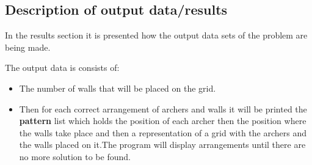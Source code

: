 \documentclass{article}
\begin{document}
\subsection{Description of output data/results}
\par In the results section it is presented how the output data sets of the problem
are being made.
\par The output data is consists of:
 \begin{itemize}
     \item The number of walls that will be placed on the grid.
     \item Then for each correct arrangement of archers and walls
     it will be printed the \textbf{pattern} list which holds the position of each archer
     then the position where the walls take place and then a representation of 
     a grid with the archers and the walls placed on it.The program will display arrangements until there are no more solution to be found.
   \end{itemize}
\newpage
\end{document}
